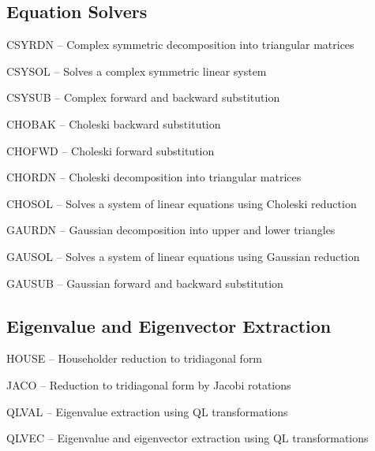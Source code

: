 \subsection*{Equation Solvers} %
\begin{list}{}{\leftmargin=57pt }
\item[CSYRDN \hfill] -- Complex symmetric decomposition into triangular matrices
\item[CSYSOL \hfill] -- Solves a complex symmetric linear system
\item[CSYSUB \hfill] -- Complex forward and backward substitution
\item[CHOBAK \hfill] -- Choleski backward substitution
\item[CHOFWD \hfill] -- Choleski forward substitution
\item[CHORDN \hfill] -- Choleski decomposition into triangular matrices
\item[CHOSOL \hfill] -- Solves a system of linear equations using Choleski reduction
\item[GAURDN \hfill] -- Gaussian decomposition into upper and lower triangles
\item[GAUSOL \hfill] -- Solves a system of linear equations using Gaussian reduction
\item[GAUSUB \hfill] -- Gaussian forward and backward substitution
\end{list}
\subsection*{Eigenvalue and Eigenvector Extraction} %
\begin{list}{}{\leftmargin=57pt }
\item[HOUSE \hfill]  -- Householder reduction to tridiagonal form
\item[JACO \hfill]   -- Reduction to tridiagonal form by Jacobi rotations
\item[QLVAL \hfill]  -- Eigenvalue extraction using QL transformations
\item[QLVEC \hfill]  -- Eigenvalue and eigenvector extraction using QL transformations
\end{list}
